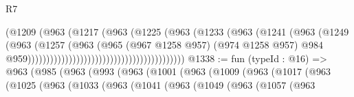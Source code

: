 \begin{lexlean}{R7}
\begin{coremodule}
                                                          (@1209
                                                            (@963
                                                              (@1217
                                                                (@963
                                                                  (@1225
                                                                    (@963
                                                                      (@1233
                                                                        (@963
                                                                          (@1241
                                                                            (@963
                                                                              (@1249
                                                                                (@963
                                                                                  (@1257
                                                                                    (@963
                                                                                      (@965
                                                                                        (@967
                                                                                          @1258
                                                                                          @957)
                                                                                        (@974
                                                                                          @1258
                                                                                          @957)
                                                                                        @984
                                                                                        @959))))))))))))))))))))))))))))))))))))))))))
@1338 := fun (typeId : @16) =>
  @963
    (@985
      (@963
        (@993
          (@963
            (@1001
              (@963
                (@1009
                  (@963
                    (@1017
                      (@963
                        (@1025
                          (@963
                            (@1033
                              (@963
                                (@1041
                                  (@963
                                    (@1049
                                      (@963
                                        (@1057
                                          (@963

\end{coremodule}
\end{lexlean}
